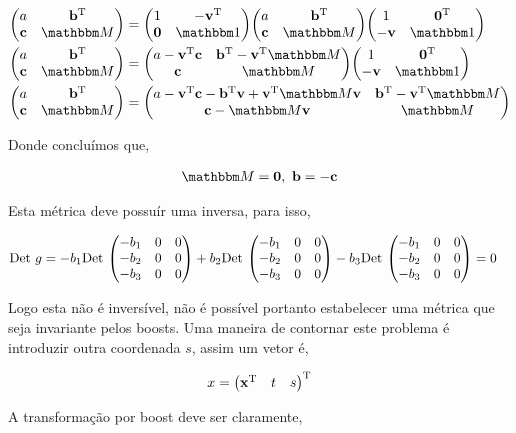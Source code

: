 \documentclass[twoside]{amsart}
\numberwithin{equation}{section}
\begin{document}
\begin{align*}
    \mqty(a&{\vb b}^{\textup T}\\ \vb c&\mathbbm M)&=\mqty(1&-\vb v^{\textup T}\\ \vb 0&\mathbbm 1)\mqty(a&{\vb b}^{\textup T}\\ \vb c&\mathbbm M)\mqty(1&\vb 0^\textup T\\-\vb v&\mathbbm 1)\\
    \mqty(a&{\vb b}^{\textup T}\\ \vb c&\mathbbm M)&=\mqty(a-\vb v^{\textup T}\vb c&\vb b^{\textup T}-\vb v^{\textup T}\mathbbm M\\ \vb c&\mathbbm M)\mqty(1&\vb 0^\textup T\\-\vb v&\mathbbm 1)\\
    \mqty(a&{\vb b}^{\textup T}\\ \vb c&\mathbbm M)&=\mqty(a-\vb v^{\textup T}\vb c-\vb b^{\textup T}\vb v+\vb v^{\textup T}\mathbbm M\vb v&\vb b^{\textup T}-\vb v^{\textup T}\mathbbm M\\ \vb c-\mathbbm M \vb v&\mathbbm M)\\
\end{align*}

Donde concluímos que,

\begin{align}
    \mathbbm M =\vb  0,\ \vb b=-\vb c
\end{align}

Esta métrica deve possuír uma inversa, para isso,

\begin{align}
    \textup{Det } g&=-b_1\textup {Det }\mqty(-b_1&0&0\\-b_2&0&0\\-b_3&0&0)+b_2\textup {Det }\mqty(-b_1&0&0\\-b_2&0&0\\-b_3&0&0)-b_3\textup {Det }\mqty(-b_1&0&0\\-b_2&0&0\\-b_3&0&0)=0
\end{align}

Logo esta não é inversível, não é possível portanto estabelecer uma métrica que seja invariante pelos boosts. Uma maneira de contornar este problema é introduzir outra coordenada $s$, assim um vetor é,

\begin{align}
    x=\mqty(\vb x^{\textup T}&t&s)^{\textup T}
\end{align}

A transformação por boost deve ser claramente,
\end{document}
